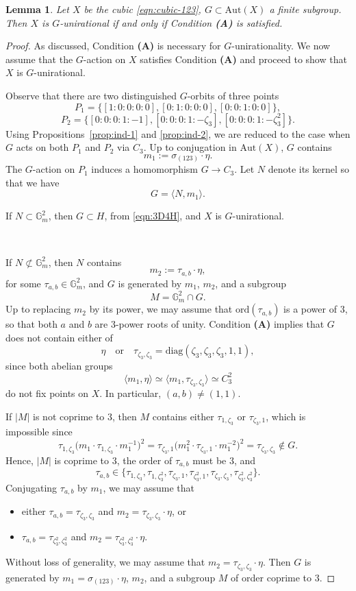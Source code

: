 \documentclass[12pt,reqno]{amsart}
\theoremstyle{plain}
\newtheorem{lemm}[prop]{Lemma}
\theoremstyle{remark}
\theoremstyle{definition}
\numberwithin{equation}{section}
\def\bG{{\mathbb G}}
\def\Aut{\mathrm{Aut}}
\begin{document}
\begin{lemm}
Let $X$ be the cubic \eqref{eqn:cubic-123}, 
$G\subset \Aut(X)$ a finite subgroup. Then $X$ is $G$-unirational if and only if Condition {\bf (A)} is satisfied. 
\end{lemm}

\begin{proof}
As discussed, Condition {\bf (A)} is necessary for $G$-unirationality. We now assume that the $G$-action on $X$ satisfies Condition {\bf (A)} and proceed to show that $X$ is $G$-unirational.

Observe that there are two distinguished $G$-orbits of three points 
$$
P_1=\{[1:0:0:0:0],[0:1:0:0:0],[0:0:1:0:0]\},
$$
$$
P_2=\{[0:0:0:1:-1],[0:0:0:1:-\zeta_3],[0:0:0:1:-\zeta_3^2]\}. 
$$
Using Propositions~\ref{prop:ind-1} and \ref{prop:ind-2}, we are reduced to the case when $G$ acts on both $P_1$ and $P_2$ via $C_3$. Up to conjugation in $\Aut(X)$, $G$ contains
$$
m_1:=\sigma_{(123)}\cdot \eta.
$$
The $G$-action on $P_1$ induces a homomorphism $G\to C_3$. Let $N$ denote its kernel so that we have
$$
G=\langle N,m_1\rangle.
$$

\noindent 
If $N\subset \bG_m^2$, then $G\subset H$, from  \eqref{eqn:3D4H}, and $X$ is $G$-unirational. 

\ 

\noindent 
If $N\not\subset \bG_m^2$, then $N$ contains 
$$
m_2:=\tau_{a,b}\cdot\eta,
$$
for some $\tau_{a,b}\in\bG_m^2$, and $G$ is generated by 
$m_1$, $m_2$, and a subgroup 
$$
M=\bG_m^2\cap G.
$$
Up to replacing $m_2$ by its power, we may assume that $\mathrm{ord}(\tau_{a,b})$ is a power of $3$, so that both $a$ and $b$ are 3-power roots of unity. Condition {\bf (A)} implies that $G$ does not contain either of 
$$
\eta \quad\text{or}\quad\tau_{\zeta_3,\zeta_3}=\mathrm{diag}(\zeta_3,\zeta_3,\zeta_3,1,1),
$$
since both abelian groups
$$
\langle m_1,\eta\rangle\simeq\langle m_1,\tau_{\zeta_3,\zeta_3}\rangle\simeq C_3^2
$$ 
do not fix points on $X$. In particular, $(a,b)\ne (1,1)$. 

 If $|M|$ is not coprime to $3$, then $M$ contains either $\tau_{1,\zeta_3}$ or $\tau_{\zeta_3,1}$, which is impossible since
$$
\tau_{1,\zeta_3}\big(m_1\cdot\tau_{1,\zeta_3}\cdot m_1^{-1}\big)^2=\tau_{\zeta_3,1}\big(m_1^2\cdot\tau_{\zeta_3,1}\cdot m_1^{-2}\big)^2=\tau_{\zeta_3,\zeta_3}\not\in G.   
$$
Hence, $|M|$ is coprime to $3$, the order of $\tau_{a,b}$ must be $3$, and
$$
\tau_{a,b}\in\big\{\tau_{1,\zeta_3},\tau_{1,\zeta_3^2},\tau_{\zeta_3,1},\tau_{\zeta_3^2,1},\tau_{\zeta_3,\zeta_3},\tau_{\zeta_3^2,\zeta_3^2}\big\}.
$$
Conjugating $\tau_{a,b}$ by $m_1$, we may assume that 
\begin{itemize}
\item either $\tau_{a,b}=\tau_{\zeta_3,\zeta_3}$ and $m_2=\tau_{\zeta_3,\zeta_3}\cdot\eta$, or
\item $\tau_{a,b}=\tau_{\zeta_3^2,\zeta_3^2}$ and $m_2=\tau_{\zeta_3^2,\zeta_3^2}\cdot\eta$.
\end{itemize}
Without loss of generality, we may assume that  $m_2=\tau_{\zeta_3,\zeta_3}\cdot\eta$. Then $G$ is generated by $m_1=\sigma_{(123)}\cdot \eta$, $m_2$, and a subgroup 
$M$ of order coprime to $3$.


\end{proof}
\end{document}
